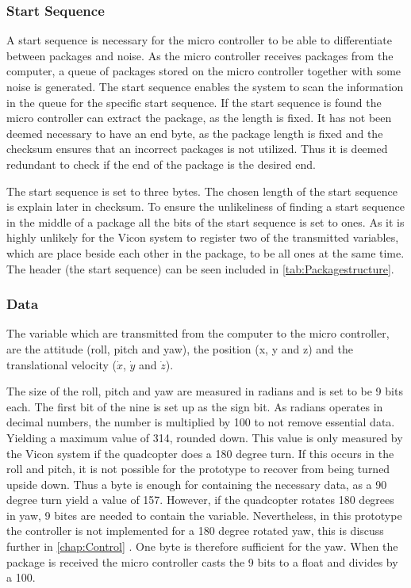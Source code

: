 \subsubsection{Start Sequence}
A start sequence is necessary for the micro controller to be able to differentiate between packages and noise. As the micro controller receives packages from the computer, a queue of packages stored on the micro controller together with some noise is generated. The start sequence enables the system to scan the information in the queue for the specific start sequence. If the start sequence is found the micro controller can extract the package, as the length is fixed. It has not been deemed necessary to have an end byte, as the package length is fixed and the checksum ensures that an incorrect packages is not utilized. Thus it is deemed redundant to check if the end of the package is the desired end.

The start sequence is set to three bytes. The chosen length of the start sequence is explain later in checksum. To ensure the unlikeliness of finding a start sequence in the middle of a package all the bits of the start sequence is set to ones. As it is highly unlikely for the Vicon system to register two of the transmitted variables, which are place beside each other in the package, to be all ones at the same time. The header (the start sequence) can be seen included in \autoref{tab:Packagestructure}.

\subsubsection{Data}
The variable which are transmitted from the computer to the micro controller, are the attitude (roll, pitch and yaw), the position (x, y and z) and the translational velocity ($\dot{x}$, $\dot{y}$ and $\dot{z}$).

The size of the roll, pitch and yaw are measured in radians and is set to be 9 bits each. The first bit of the nine is set up as the sign bit. As radians operates in decimal numbers, the number is multiplied by 100 to not remove essential data. Yielding a maximum value of 314, rounded down. This value is only measured by the Vicon system if the quadcopter does a 180 degree turn. If this occurs in the roll and pitch, it is not possible for the prototype to recover from being turned upside down. Thus a byte is enough for containing the necessary data, as a 90 degree turn yield a value of 157. However, if the quadcopter rotates 180 degrees in yaw, 9 bites are needed to contain the variable. Nevertheless, in this prototype the controller is not implemented for a 180 degree rotated yaw, this is discuss further in \autoref{chap:Control} . One byte is therefore sufficient for the yaw. When the package is received the micro controller casts the 9 bits to a float and divides by a 100.

